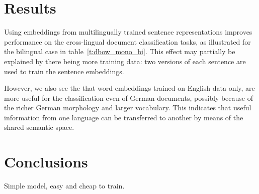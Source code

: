 \documentclass[a4paper,11pt]{article}
\begin{document}


\section*{Results}

Using embeddings from multilingually trained sentence representations improves performance on the cross-lingual document classification tasks, as illustrated for the bilingual case in table~\ref{t:dbow_mono_bi}. This effect may partially be explained by there being more training data: two versions of each sentence are used to train the sentence embeddings. 

However, we also see the that word embeddings trained on English data only, are more useful for the classification even of German documents, possibly because of the richer German morphology and larger vocabulary. This indicates that useful information from one language can be transferred to another by means of the shared semantic space.








\section*{Conclusions}
Simple model, easy and cheap to train. 
\end{document}
